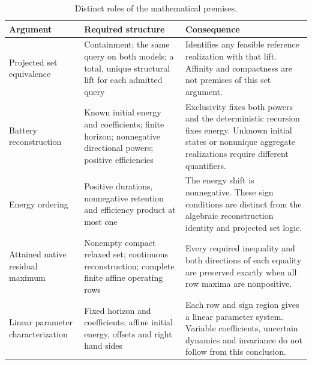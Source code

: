 \begin{table}[htbp]
\caption{Distinct roles of the mathematical premises.}\label{tab:assumption_roles}
\begin{tabularx}{\linewidth}{@{}p{.22\linewidth}p{.41\linewidth}X@{}}
\toprule Argument & Required structure & Consequence\\\midrule
Projected set equivalence & Containment; the same query on both models; a total, unique structural lift for each admitted query & Identifies any feasible reference realization with that lift. Affinity and compactness are not premises of this set argument.\\[3pt]
Battery reconstruction & Known initial energy and coefficients; finite horizon; nonnegative directional powers; positive efficiencies & Exclusivity fixes both powers and the deterministic recursion fixes energy. Unknown initial states or nonunique aggregate realizations require different quantifiers.\\[3pt]
Energy ordering & Positive durations, nonnegative retention and efficiency product at most one & The energy shift is nonnegative. These sign conditions are distinct from the algebraic reconstruction identity and projected set logic.\\[3pt]
Attained native residual maximum & Nonempty compact relaxed set; continuous reconstruction; complete finite affine operating rows & Every required inequality and both directions of each equality are preserved exactly when all row maxima are nonpositive.\\[3pt]
Linear parameter characterization & Fixed horizon and coefficients; affine initial energy, offsets and right hand sides & Each row and sign region gives a linear parameter system. Variable coefficients, uncertain dynamics and invariance do not follow from this conclusion.\\
\bottomrule\end{tabularx}
\end{table}

